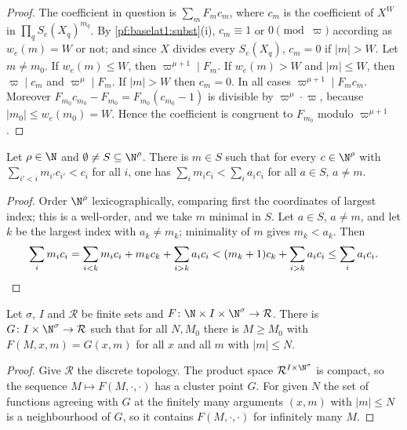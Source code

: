 \begin{proof}
The coefficient in question is $\sum_mF_mc_m$, where $c_m$ is the coefficient of $X^W$ in $\prod_qS_e(X_q)^{m_q}$. By
\cref{pf:baselat1:subst}(i), $c_m\equiv1$ or $0\pmod\varpi$ according as $w_e(m)=W$ or not; and since $X$ divides every
$S_e(X_q)$, $c_m=0$ if $|m|>W$. Let $m\ne m_0$. If $w_e(m)\le W$, then $\varpi^{\mu+1}\mid F_m$. If $w_e(m)>W$ and
$|m|\le W$, then $\varpi\mid c_m$ and $\varpi^\mu\mid F_m$. If $|m|>W$ then $c_m=0$. In all cases
$\varpi^{\mu+1}\mid F_mc_m$. Moreover $F_{m_0}c_{m_0}-F_{m_0}=F_{m_0}(c_{m_0}-1)$ is divisible by $\varpi^{\mu}\cdot\varpi$,
because $|m_0|\le w_e(m_0)=W$. Hence the coefficient is congruent to $F_{m_0}$ modulo $\varpi^{\mu+1}$.
\end{proof}

\begin{lemma}\label{pf:baselat1:leastweight}
Let $\rho\in\N$ and $\emptyset\ne S\subseteq\N^\rho$. There is $m\in S$ such that for every $c\in\N^\rho$ with
$\sum_{i'<i}m_{i'}c_{i'}<c_i$ for all $i$, one has $\sum_im_ic_i<\sum_ia_ic_i$ for all $a\in S$, $a\ne m$.
\end{lemma}

\begin{proof}
Order $\N^\rho$ lexicographically, comparing first the coordinates of largest index; this is a well-order, and we take
$m$ minimal in $S$. Let $a\in S$, $a\ne m$, and let $k$ be the largest index with $a_k\ne m_k$; minimality of $m$ gives
$m_k<a_k$. Then
\[
\sum_im_ic_i=\sum_{i<k}m_ic_i+m_kc_k+\sum_{i>k}a_ic_i<(m_k+1)c_k+\sum_{i>k}a_ic_i\le\sum_ia_ic_i.\qedhere
\]
\end{proof}

\begin{lemma}\label{pf:baselat1:limit}
Let $\sigma$, $I$ and $\mathcal R$ be finite sets and $F\colon\N\times I\times\N^\sigma\to\mathcal R$. There is
$G\colon I\times\N^\sigma\to\mathcal R$ such that for all $N,M_0$ there is $M\ge M_0$ with $F(M,x,m)=G(x,m)$ for all $x$
and all $m$ with $|m|\le N$.
\end{lemma}

\begin{proof}
Give $\mathcal R$ the discrete topology. The product space $\mathcal R^{I\times\N^\sigma}$ is compact, so the sequence
$M\mapsto F(M,\cdot,\cdot)$ has a cluster point $G$. For given $N$ the set of functions agreeing with $G$ at the finitely
many arguments $(x,m)$ with $|m|\le N$ is a neighbourhood of $G$, so it contains $F(M,\cdot,\cdot)$ for infinitely many
$M$.
\end{proof}

